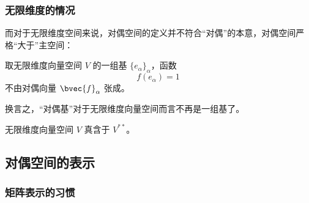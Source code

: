 


\subsubsection{无限维度的情况}

而对于无限维度空间来说，对偶空间的定义并不符合“对偶”的本意，对偶空间严格“大于”主空间：

\begin{theorem}{}
取无限维度向量空间 $V$ 的一组基 $\{e_\alpha\}_\alpha$，函数
\begin{equation}
f(e_\alpha) = 1~
\end{equation}
不由对偶向量 $\bvec{f}_\alpha$ 张成。
\end{theorem}

换言之，“对偶基”对于无限维度向量空间而言不再是一组基了。

\begin{corollary}{}
无限维度向量空间 $V$ 真含于 $V^{**}$。
\end{corollary}

\subsection{对偶空间的表示}\label{sub_DualSp_1}

\subsubsection{矩阵表示的习惯}


